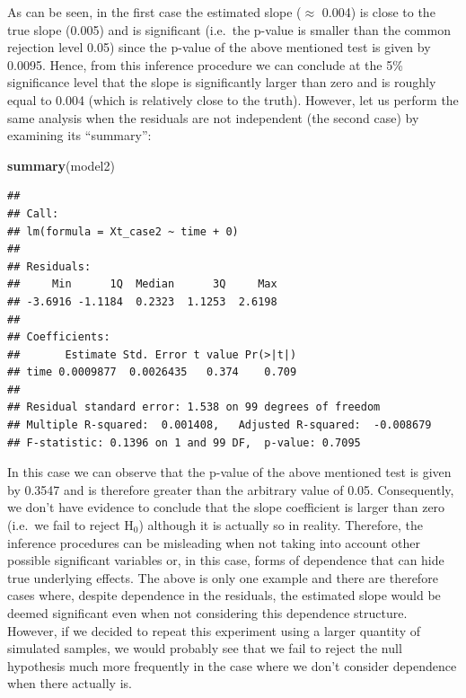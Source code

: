 \documentclass[]{book}
\newenvironment{Shaded}{\begin{snugshade}}{\end{snugshade}}
\newcommand{\KeywordTok}[1]{\textcolor[rgb]{0.13,0.29,0.53}{\textbf{#1}}}
\newcommand{\NormalTok}[1]{#1}
\theoremstyle{definition}
\theoremstyle{definition}
\theoremstyle{definition}
\theoremstyle{remark}
\begin{document}
As can be seen, in the first case the estimated slope (\(\approx\)
0.004) is close to the true slope (0.005) and is significant (i.e.~the
p-value is smaller than the common rejection level 0.05) since the
p-value of the above mentioned test is given by 0.0095. Hence, from this
inference procedure we can conclude at the 5\% significance level that
the slope is significantly larger than zero and is roughly equal to
0.004 (which is relatively close to the truth). However, let us perform
the same analysis when the residuals are not independent (the second
case) by examining its ``summary'':

\begin{Shaded}
\begin{Highlighting}[]
\KeywordTok{summary}\NormalTok{(model2)}
\end{Highlighting}
\end{Shaded}

\begin{verbatim}
## 
## Call:
## lm(formula = Xt_case2 ~ time + 0)
## 
## Residuals:
##     Min      1Q  Median      3Q     Max 
## -3.6916 -1.1184  0.2323  1.1253  2.6198 
## 
## Coefficients:
##       Estimate Std. Error t value Pr(>|t|)
## time 0.0009877  0.0026435   0.374    0.709
## 
## Residual standard error: 1.538 on 99 degrees of freedom
## Multiple R-squared:  0.001408,   Adjusted R-squared:  -0.008679 
## F-statistic: 0.1396 on 1 and 99 DF,  p-value: 0.7095
\end{verbatim}

In this case we can observe that the p-value of the above mentioned test
is given by 0.3547 and is therefore greater than the arbitrary value of
0.05. Consequently, we don't have evidence to conclude that the slope
coefficient is larger than zero (i.e.~we fail to reject H\(_0\))
although it is actually so in reality. Therefore, the inference
procedures can be misleading when not taking into account other possible
significant variables or, in this case, forms of dependence that can
hide true underlying effects. The above is only one example and there
are therefore cases where, despite dependence in the residuals, the
estimated slope would be deemed significant even when not considering
this dependence structure. However, if we decided to repeat this
experiment using a larger quantity of simulated samples, we would
probably see that we fail to reject the null hypothesis much more
frequently in the case where we don't consider dependence when there
actually is.
\end{document}
